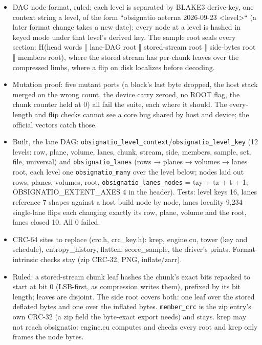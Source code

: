 \begin{itemize}
\item DAG node format, ruled: each level is separated by BLAKE3 derive-key, one context string a level, of the form “obsignatio aeterna 2026-09-23 <level>“ (a later format change takes a new date); every node at a level is hashed in keyed mode under that level's derived key. The sample root seals every section: H(head words ‖ lane-DAG root ‖ stored-stream root ‖ side-bytes root ‖ members root), where the stored stream has per-chunk leaves over the compressed limbs, where a flip on disk localizes before decoding.
\item Mutation proof: five mutant ports (a block's last byte dropped, the host stack merged on the wrong count, the device carry zeroed, no ROOT flag, the chunk counter held at 0) all fail the suite, each where it should. The every-length and flip checks cannot see a core bug shared by host and device; the official vectors catch those.
\item Built, the lane DAG: \texttt{obsignatio\_\allowbreak{}level\_\allowbreak{}context}/\texttt{obsignatio\_\allowbreak{}level\_\allowbreak{}key} (12 levels: row, plane, volume, lanes, chunk, stream, side, members, sample, set, file, universal) and \texttt{obsignatio\_\allowbreak{}lanes} (rows → planes → volumes → lanes root, each level one \texttt{obsignatio\_\allowbreak{}many} over the level below; nodes laid out rows, planes, volumes, root, \texttt{obsignatio\_\allowbreak{}lanes\_\allowbreak{}nodes} = tzy + tz + t + 1; OBSIGNATIO\_\allowbreak{}EXTENT\_\allowbreak{}AXES 4 in the header). Tests: level keys 16, lanes reference 7 shapes against a host build node by node, lanes locality 9,234 single-lane flips each changing exactly its row, plane, volume and the root, lanes closed 10. All 0 failed.
\item CRC-64 sites to replace (crc.h, crc\_\allowbreak{}key.h): krep, engine.cu, tower (key and schedule), entropy\_\allowbreak{}history, flatten, score\_\allowbreak{}sample, the driver's prints. Format-intrinsic checks stay (zip CRC-32, PNG, inflate/zarr).
\item Ruled: a stored-stream chunk leaf hashes the chunk's exact bits repacked to start at bit 0 (LSB-first, as compression writes them), prefixed by its bit length; leaves are disjoint. The side root covers both: one leaf over the stored deflated bytes and one over the inflated bytes. \texttt{member\_\allowbreak{}crc} is the zip entry's own CRC-32 (a zip field the byte-exact export needs) and stays. krep may not reach obsignatio: engine.cu computes and checks every root and krep only frames the node bytes.

\end{itemize}
